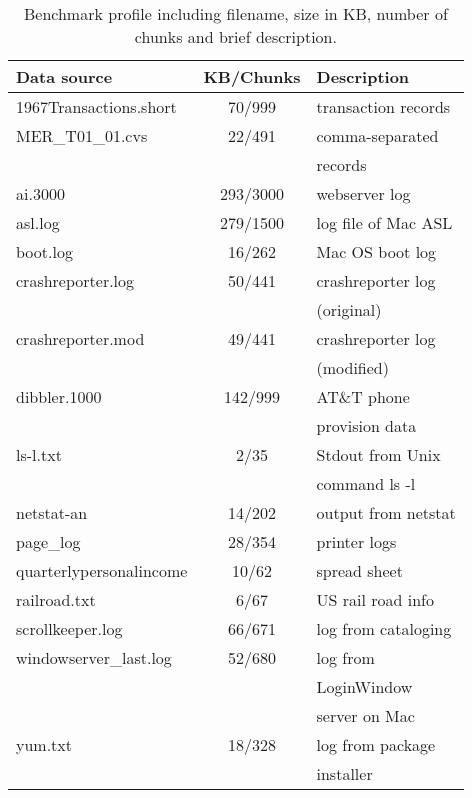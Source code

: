 \begin{table}
\begin{center}
\begin{tabular}{|l||c|l|} \hline
Data source		& KB/Chunks		& Description \\ \hline \hline
1967Transactions.short	& 70/999		& transaction records \\ \hline
MER\_T01\_01.cvs	& 22/491 	& comma-separated \\
                                        && records\\ \hline
ai.3000			& 293/3000	& webserver log \\ \hline
asl.log 		& 279/1500	& log file of Mac ASL \\ \hline	
boot.log		& 16/262		& Mac OS boot log \\ \hline
crashreporter.log 	& 50/441 	& crashreporter log \\ 
			&		& (original) \\ \hline
crashreporter.mod 	& 49/441		& crashreporter log \\
			&		& (modified) \\ \hline
dibbler.1000		& 142/999 	& AT\&T phone \\
			&		& provision data \\ \hline
ls-l.txt		& 2/35		& Stdout from Unix \\
			&		& command ls -l \\ \hline
netstat-an		& 14/202		& output from netstat \\ \hline
page\_log		& 28/354		& printer logs \\ \hline
quarterlypersonalincome	& 10/62		& spread sheet \\ \hline 
railroad.txt		& 6/67		& US rail road info \\ \hline
scrollkeeper.log 	& 66/671		& log from cataloging \\ \hline
windowserver\_last.log 	& 52/680		& log from  \\
                        &               & LoginWindow \\
                        &               & server on Mac \\ \hline
yum.txt			& 18/328		& log from package \\
                                           && installer\\ \hline
\end{tabular}
\caption{Benchmark profile including filename, size in KB, number of chunks
and brief description.} \label{tab:benchmarks}
\end{center}
\end{table}

